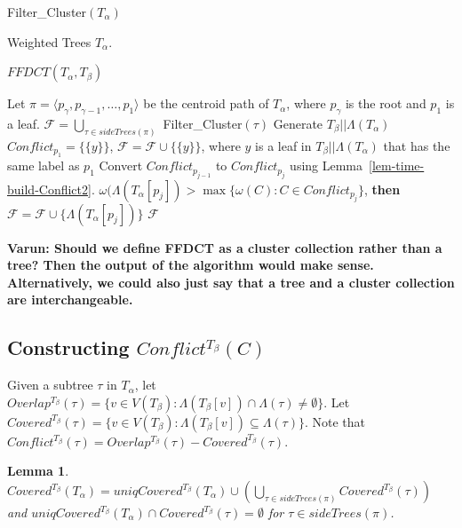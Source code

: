 \documentclass[final,1p,times]{elsarticle}
\newcommand{\weight}{\omega}
\newcommand{\TA}{T_\alpha}
\newcommand{\TB}{T_\beta}
\newtheorem{lemma}[theorem]{Lemma}
\begin{document}
    \begin{algorithm}[!ht]
		\caption{Filter\_Cluster$(\TA)$}
        \label{alg:FFDCT}

        \begin{algorithmic}[1]
		\Input Weighted Trees $\TA$.

		\Output $FFDCT(\TA, \TB)$

            \State Let $\pi = \langle p_{\gamma}, p_{\gamma - 1}, \dots, p_1 \rangle$ be the centroid path of $\TA$, where $p_{\gamma}$ is the root and $p_1$ is a leaf.
            \label{step:centroidpath}
		\State $\mathcal{F} = \bigcup_{\tau \in sideTrees(\pi)}$ Filter\_Cluster$(\tau)$
		\label{step:sideTrees}
		\State Generate $\TB||\Lambda(\TA)$
            \label{step:restriction}
		\State $Conflict_{p_1} = \{ \{y\} \}$, $\mathcal{F}=\mathcal{F} \cup \{ \{y\} \}$, where $y$ is a leaf in $T_{\beta}||\Lambda(\TA)$ that has the same label as $p_1$
		\label{step:conflict_start}
			\State Convert $Conflict_{p_{j-1}}$ to $Conflict_{p_j}$ using Lemma~\ref{lem-time-build-Conflict2}.
			 $\weight(\Lambda(\TA[p_j]) > \max \{ \weight(C) : C \in Conflict_{p_j} \}$, {\bf then} $\mathcal{F} = \mathcal{F} \cup \{ \Lambda(\TA[p_j]) \}$
		\EndFor
		\label{step:conflict_end}
		\State \Return $\mathcal{F}$
        \end{algorithmic}
    \end{algorithm}

	{\bf Varun: Should we define FFDCT as a cluster collection rather than a tree? Then the output of the algorithm would make sense. Alternatively, we could also just say that a tree and a cluster collection are interchangeable.}

    \subsection{Constructing $Conflict^{\TB}(C)$}
    Given a subtree $\tau$ in $T_{\alpha}$, let $Overlap^{\TB}(\tau) = \{ v \in V(T_{\beta}) : \Lambda(T_{\beta}[v]) \cap \Lambda(\tau) \neq \emptyset \}$.
    Let $Covered^{\TB}(\tau) = \{ v \in V(T_{\beta}) : \Lambda(T_{\beta}[v]) \subseteq \Lambda(\tau) \}$.
    Note that $Conflict^{\TB}(\tau) = Overlap^{\TB}(\tau) - Covered^{\TB}(\tau)$.
    \begin{lemma}
	$Covered^{\TB}(\TA) = uniqCovered^{\TB}(\TA) \cup \left( \bigcup_{\tau \in sideTrees(\pi)} Covered^{\TB}(\tau) \right)$
	    and $uniqCovered^{\TB}(\TA) \cap Covered^{\TB}(\tau) = \emptyset$ for $\tau \in sideTrees(\pi)$.
    \end{lemma}
\end{document}
